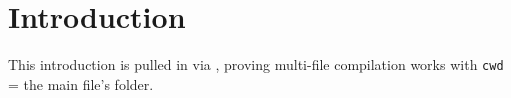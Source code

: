 \section{Introduction}
This introduction is pulled in via \verb||,
proving multi-file compilation works with \texttt{cwd} = the main file's folder.
